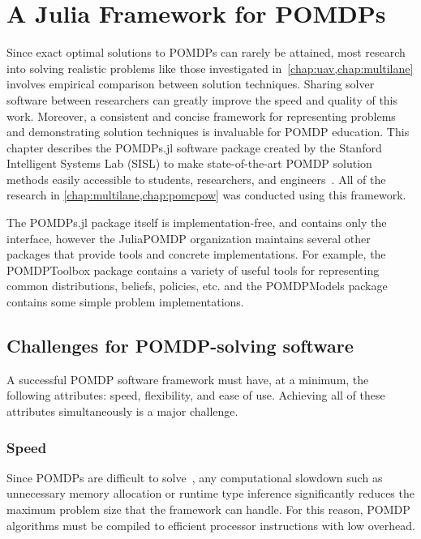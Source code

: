 \chapter{A Julia Framework for POMDPs} \label{chap:pomdpsjl}

Since exact optimal solutions to POMDPs can rarely be attained, most research into solving realistic problems like those investigated in~\cref{chap:uav,chap:multilane} involves empirical comparison between solution techniques.
Sharing solver software between researchers can greatly improve the speed and quality of this work.
Moreover, a consistent and concise framework for representing problems and demonstrating solution techniques is invaluable for POMDP education.
This chapter describes the POMDPs.jl software package created by the Stanford Intelligent Systems Lab (SISL) to make state-of-the-art POMDP solution methods easily accessible to students, researchers, and engineers~\cite{egorov2017pomdps}.
All of the research in \cref{chap:multilane,chap:pomcpow} was conducted using this framework.

The POMDPs.jl package itself is implementation-free, and contains only the interface, however the JuliaPOMDP organization maintains several other packages that provide tools and concrete implementations. For example, the POMDPToolbox package contains a variety of useful tools for representing common distributions, beliefs, policies, etc. and the POMDPModels package contains some simple problem implementations.

\section{Challenges for POMDP-solving software}

A successful POMDP software framework must have, at a minimum, the following attributes: speed, flexibility, and ease of use. Achieving all of these attributes simultaneously is a major challenge.

\subsection{Speed}

Since POMDPs are difficult to solve~\cite{papadimitriou1987complexity}, any computational slowdown such as unnecessary memory allocation or runtime type inference significantly reduces the maximum problem size that the framework can handle.
For this reason, POMDP algorithms must be compiled to efficient processor instructions with low overhead.


